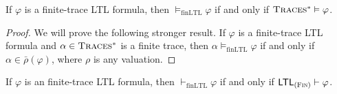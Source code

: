 \documentclass[acmsmall]{acmart}
\newcommand{\barrho}{\bar{\rho}}
\newcommand{\finTraces}{\textsc{Traces$^*$}\xspace}
\newcommand{\MLLTL}{\textnormal{\textsf{LTL}}\xspace}
\newcommand{\MLfinLTL}{\MLLTL_\Fin}
\newcommand{\prule}[1]{\textnormal{(\textsc{#1})}}
\newcommand{\Fin}{\prule{Fin}\xspace}
\newcommand{\finLTL}{\mathrm{finLTL}}
\begin{document}
\begin{proposition}
If $\varphi$ is a finite-trace LTL formula, then
$\vDash_\finLTL \varphi$ if and only if
$\finTraces \vDash \varphi$.
\end{proposition}
\begin{proof}
We will prove the following stronger result.
If $\varphi$ is a finite-trace LTL formula
and $\alpha \in \finTraces$ is a finite trace,
then
$\alpha \vDash_\finLTL \varphi$ if and only if
$\alpha \in \barrho(\varphi)$,
where $\rho$ is any valuation.
\end{proof}

\begin{theorem}
If $\varphi$ is an finite-trace LTL formula, 
then $\vdash_\finLTL \varphi$ if and only if
$\MLfinLTL \vdash \varphi$.
\label{thm_csrvext_finLTL}
\end{theorem}
\end{document}
